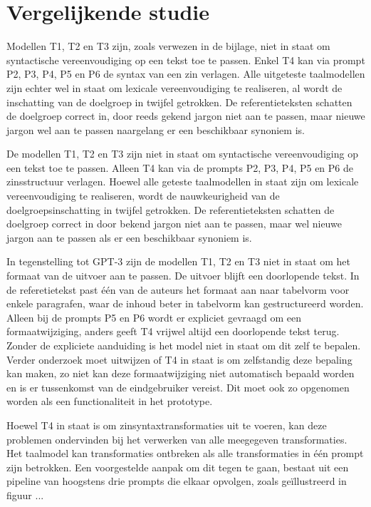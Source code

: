 \section{Vergelijkende studie}

Modellen T1, T2 en T3 zijn, zoals verwezen in de bijlage, niet in staat om syntactische vereenvoudiging op een tekst toe te passen. Enkel T4 kan via prompt P2, P3, P4, P5 en P6 de syntax van een zin verlagen. Alle uitgeteste taalmodellen zijn echter wel in staat om lexicale vereenvoudiging te realiseren, al wordt de inschatting van de doelgroep in twijfel getrokken. De referentieteksten schatten de doelgroep correct in, door reeds gekend jargon niet aan te passen, maar nieuwe jargon wel aan te passen naargelang er een beschikbaar synoniem is.

\medspace

De modellen T1, T2 en T3 zijn niet in staat om syntactische vereenvoudiging op een tekst toe te passen. Alleen T4 kan via de prompts P2, P3, P4, P5 en P6 de zinsstructuur verlagen. Hoewel alle geteste taalmodellen in staat zijn om lexicale vereenvoudiging te realiseren, wordt de nauwkeurigheid van de doelgroepsinschatting in twijfel getrokken. De referentieteksten schatten de doelgroep correct in door bekend jargon niet aan te passen, maar wel nieuwe jargon aan te passen als er een beschikbaar synoniem is. 

\medspace

In tegenstelling tot GPT-3 zijn de modellen T1, T2 en T3 niet in staat om het formaat van de uitvoer aan te passen. De uitvoer blijft een doorlopende tekst. In de referetietekst past één van de auteurs het formaat aan naar tabelvorm voor enkele paragrafen, waar de inhoud beter in tabelvorm kan gestructureerd worden. Alleen bij de prompts P5 en P6 wordt er expliciet gevraagd om een formaatwijziging, anders geeft T4 vrijwel altijd een doorlopende tekst terug. Zonder de expliciete aanduiding is het model niet in staat om dit zelf te bepalen. Verder onderzoek moet uitwijzen of T4 in staat is om zelfstandig deze bepaling kan maken, zo niet kan deze formaatwijziging niet automatisch bepaald worden en is er tussenkomst van de eindgebruiker vereist. Dit moet ook zo opgenomen worden als een functionaliteit in het prototype.

\medspace

Hoewel T4 in staat is om zinsyntaxtransformaties uit te voeren, kan deze problemen ondervinden bij het verwerken van alle meegegeven transformaties. Het taalmodel kan transformaties ontbreken als alle transformaties in één prompt zijn betrokken. Een voorgestelde aanpak om dit tegen te gaan, bestaat uit een pipeline van hoogstens drie prompts die elkaar opvolgen, zoals geïllustreerd in figuur ...

